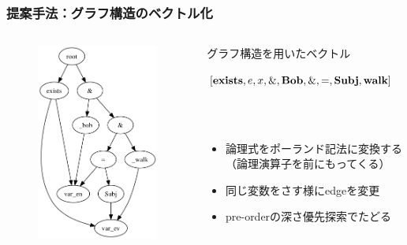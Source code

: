 \documentclass[dvipdfmx]{beamer}
\newcommand{\LF}[1]{\ensuremath{\texttt{\bf #1}}}
\begin{document}
\begin{frame}
\frametitle{提案手法：グラフ構造のベクトル化}
\begin{columns}[t]
    \begin{column}{0.4\textwidth} %
        \begin{figure}[h]
        	\includegraphics[width=4cm]{graph.png}
                \label{fig:graph}
        \end{figure}
    \end{column}
    \begin{column}{0.6\textwidth} %
      \begin{block}{グラフ構造を用いたベクトル}
        \begin{center}
         $[\LF{exists},e,x,\&,\LF{Bob},\&,=,\LF{Subj},\LF{walk}]$
         \end{center}
      \end{block}
      \\~\
      \begin{itemize}
        \item 論理式をポーランド記法に変換する\\（論理演算子を前にもってくる）
        \item 同じ変数をさす様にedgeを変更
        \item pre-orderの深さ優先探索でたどる
      \end{itemize}
    \end{column}
\end{columns}

\end{frame}
\end{document}

